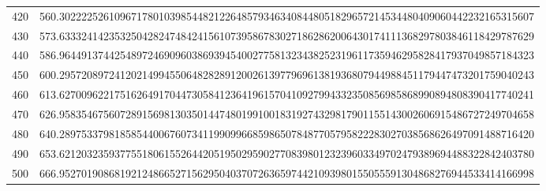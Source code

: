 \documentclass[final]{article}
\begin{document}
\begin{table}
\begin{center}
\begin{tabular}{|c|c|}
\\
420 &   560.30222252610967178010398544821226485793463408448051829657214534480409060442232165315607%
\\
430 &   573.63332414235325042824748424156107395867830271862862006430174111368297803846118429787629%
\\
440 &   586.96449137442548972469096038693945400277581323438252319611735946295828417937049857184323%
\\
450 &   600.29572089724120214994550648282891200261397796961381936807944988451179447473201759040243%
\\
460 &   613.62700962217516264917044730584123641961570410927994332350856985868990894808390417740241%
\\
470 &   626.95835467560728915698130350144748019910018319274329817901155143002606915486727249704658%
\\
480 &   640.28975337981858544006760734119909966859865078487705795822283027038568626497091488716420%
\\
490 &   653.62120323593775518061552644205195029590277083980123239603349702479389694488322842403780%
\\
500 &   666.95270190868192124866527156295040370726365974421093980155055591304868276944533414166998%
\\
\hline
\hline
\end{tabular}
\end{center}
\bigskip\bigskip
\end{table}
\end{document}
